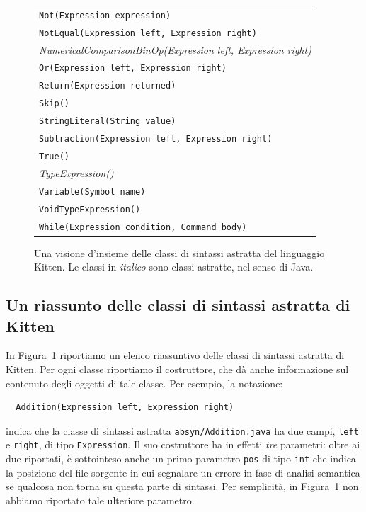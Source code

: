\begin{figure}
\begin{center}
{\begin{tabular}{l}
\texttt{Not(Expression expression)} \\
\texttt{NotEqual(Expression left, Expression right)} \\
\textit{NumericalComparisonBinOp(Expression left, Expression right)} \\
\texttt{Or(Expression left, Expression right)} \\
\texttt{Return(Expression returned)} \\
\texttt{Skip()} \\
\texttt{StringLiteral(String value)} \\
\texttt{Subtraction(Expression left, Expression right)} \\
\texttt{True()} \\
\textit{TypeExpression()} \\
\texttt{Variable(Symbol name)} \\
\texttt{VoidTypeExpression()} \\
\texttt{While(Expression condition, Command body)}
\end{tabular}
}
\end{center}
\caption{Una visione d'insieme delle classi di sintassi astratta del linguaggio Kitten. Le classi in \emph{italico} sono classi astratte, nel senso di Java.}
  \label{fig:abstract_classes}
\end{figure}
%
\subsection{Un riassunto delle classi di sintassi astratta di Kitten}
  \label{subsec:abstract_classes}
%
In Figura~\ref{fig:abstract_classes} riportiamo un elenco riassuntivo delle
classi di sintassi astratta di Kitten. Per ogni classe riportiamo il
costruttore, che d\`a anche informazione sul contenuto degli oggetti di tale
classe. Per esempio, la notazione:
%
\begin{verbatim}
  Addition(Expression left, Expression right)
\end{verbatim}
%
indica che la classe di sintassi astratta \texttt{absyn/Addition.java}
ha due campi, \texttt{left} e \texttt{right}, di tipo
\texttt{Expression}. Il suo costruttore ha in effetti \emph{tre} parametri:
oltre ai due riportati, \`e sottointeso anche un primo parametro \texttt{pos}
di tipo \texttt{int} che indica la posizione del file sorgente in cui segnalare
un errore in fase di analisi semantica se qualcosa non torna su questa parte
di sintassi. Per semplicit\`a, in Figura~\ref{fig:abstract_classes}
non abbiamo riportato tale ulteriore parametro.

